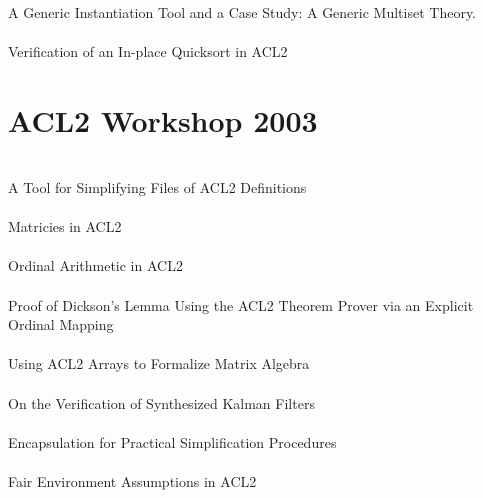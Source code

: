 \documentclass{article}
\begin{document}
\cite{02-martin-instantiation} \\
A Generic Instantiation Tool and a Case Study: A Generic Multiset Theory. \\

\cite{02-ray-quicksort} \\
Verification of an In-place Quicksort in ACL2 \\


\section{ACL2 Workshop 2003}

\cite{03-kaufmann-simplifying} \\
A Tool for Simplifying Files of ACL2 Definitions \\

\cite{03-hendrix-matricies} \\
Matricies in ACL2 \\

\cite{03-manolios-ordinal} \\
Ordinal Arithmetic in ACL2 \\

\cite{03-sustik-dickson} \\
Proof of Dickson's Lemma Using the ACL2 Theorem Prover via an Explicit Ordinal Mapping \\

\cite{03-gamboa-arrays} \\
Using ACL2 Arrays to Formalize Matrix Algebra \\

\cite{03-gamboa-kalman} \\
On the Verification of Synthesized Kalman Filters \\

\cite{03-matlin-encapsulation} \\
Encapsulation for Practical Simplification Procedures \\

\cite{03-sumners-fairness} \\
Fair Environment Assumptions in ACL2 \\
\end{document}
